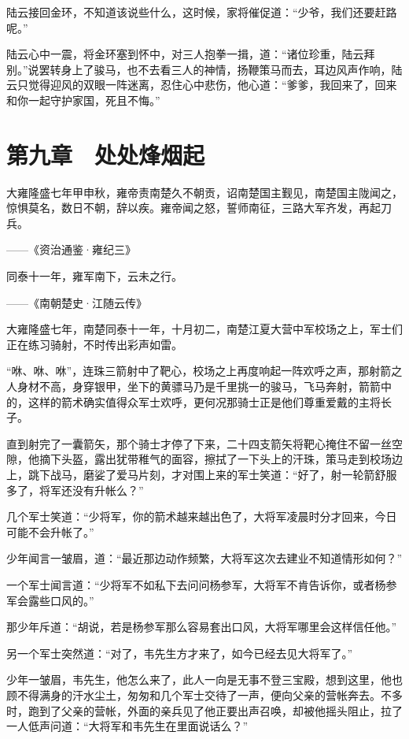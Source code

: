陆云接回金环，不知道该说些什么，这时候，家将催促道：“少爷，我们还要赶路呢。”

陆云心中一震，将金环塞到怀中，对三人抱拳一揖，道：“诸位珍重，陆云拜别。”说罢转身上了骏马，也不去看三人的神情，扬鞭策马而去，耳边风声作响，陆云只觉得迎风的双眼一阵迷离，忍住心中悲伤，他心道：“爹爹，我回来了，回来和你一起守护家国，死且不悔。”

\chapter{第九章　处处烽烟起}

大雍隆盛七年甲申秋，雍帝责南楚久不朝贡，诏南楚国主觐见，南楚国主陇闻之，惊惧莫名，数日不朝，辞以疾。雍帝闻之怒，誓师南征，三路大军齐发，再起刀兵。

——《资治通鉴·雍纪三》

同泰十一年，雍军南下，云未之行。

——《南朝楚史·江随云传》

大雍隆盛七年，南楚同泰十一年，十月初二，南楚江夏大营中军校场之上，军士们正在练习骑射，不时传出彩声如雷。

“咻、咻、咻”，连珠三箭射中了靶心，校场之上再度响起一阵欢呼之声，那射箭之人身材不高，身穿银甲，坐下的黄骠马乃是千里挑一的骏马，飞马奔射，箭箭中的，这样的箭术确实值得众军士欢呼，更何况那骑士正是他们尊重爱戴的主将长子。

直到射完了一囊箭矢，那个骑士才停了下来，二十四支箭矢将靶心掩住不留一丝空隙，他摘下头盔，露出犹带稚气的面容，擦拭了一下头上的汗珠，策马走到校场边上，跳下战马，磨娑了爱马片刻，才对围上来的军士笑道：“好了，射一轮箭舒服多了，将军还没有升帐么？”

几个军士笑道：“少将军，你的箭术越来越出色了，大将军凌晨时分才回来，今日可能不会升帐了。”

少年闻言一皱眉，道：“最近那边动作频繁，大将军这次去建业不知道情形如何？”

一个军士闻言道：“少将军不如私下去问问杨参军，大将军不肯告诉你，或者杨参军会露些口风的。”

那少年斥道：“胡说，若是杨参军那么容易套出口风，大将军哪里会这样信任他。”

另一个军士突然道：“对了，韦先生方才来了，如今已经去见大将军了。”

少年一皱眉，韦先生，他怎么来了，此人一向是无事不登三宝殿，想到这里，他也顾不得满身的汗水尘土，匆匆和几个军士交待了一声，便向父亲的营帐奔去。不多时，跑到了父亲的营帐，外面的亲兵见了他正要出声召唤，却被他摇头阻止，拉了一人低声问道：“大将军和韦先生在里面说话么？”

